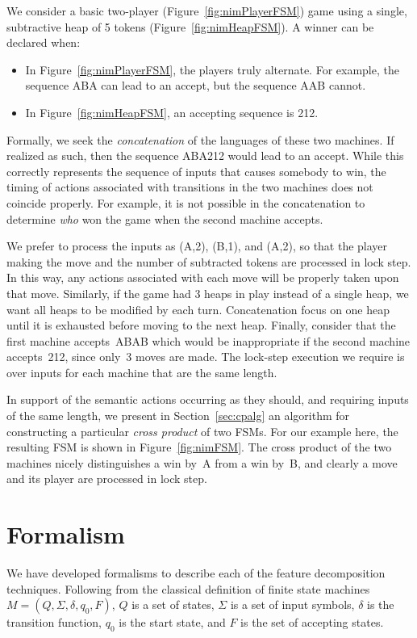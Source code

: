 \documentclass[sigplan,anonymous,review]{acmart}
\begin{document}
We consider a basic two-player (Figure~\ref{fig:nimPlayerFSM}) game using a single, subtractive heap of 5 tokens (Figure~\ref{fig:nimHeapFSM}).
A winner can be declared when:
\begin{itemize}
    \item In Figure~\ref{fig:nimPlayerFSM}, the players truly alternate.  For example, the sequence ABA can lead to an accept, but the sequence AAB cannot.
    \item In Figure~\ref{fig:nimHeapFSM}, an accepting sequence is 212.
\end{itemize}
Formally, we seek the \emph{concatenation} of the languages of these two machines.  If realized as such, then the sequence ABA212 would lead to an accept. While this correctly represents the sequence of inputs that causes somebody to win, the timing of actions associated with transitions in the two machines does not coincide properly.  For example, it is not possible in the concatenation to determine \emph{who} won the game when the second machine accepts.

We prefer to process the inputs as (A,2), (B,1), and (A,2), so that the player making the move and the number of subtracted tokens are processed in lock step.  In this way, any actions associated with each move will be properly taken upon that move.  Similarly, if the game had 3 heaps in play instead of a single heap, we want all heaps to be modified by each turn.  Concatenation focus on one heap until it is exhausted before moving to the next heap.    Finally, consider that the first machine accepts~ABAB which would be inappropriate if the second machine accepts~212, since only~3 moves are made.  The lock-step execution we require is over inputs for each machine that are the same length.

In support of the semantic actions occurring as they should, and requiring inputs of the same length, we present in Section~\ref{sec:cpalg} an algorithm for constructing a particular \emph{cross product} of two FSMs.  For our example here, the resulting FSM is shown in Figure~\ref{fig:nimFSM}.  The cross product of the two machines nicely distinguishes a win by~A from a win by~B, and clearly a move and its player are processed in lock step.

\section{Formalism}\label{sec:formal}
We have developed formalisms to describe each of the feature decomposition techniques. Following from the classical definition of finite state machines $M = (Q, \Sigma, \delta, q_0, F)$, $Q$ is a set of states, $\Sigma$ is a set of input symbols, $\delta$ is the transition function, $q_0$ is the start state, and $F$ is the set of accepting states. \\
\end{document}
